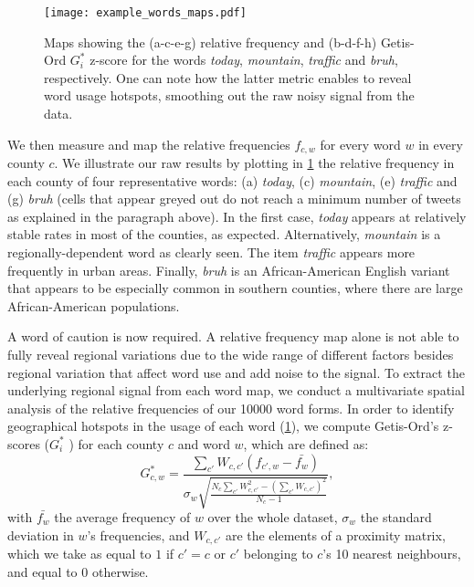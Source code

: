 \documentclass[../thesis.tex]{subfiles}
\begin{document}
\begin{figure}[hpt!]
\centering
  \texttt{[image: example\_words\_maps.pdf]}
  \caption{Maps showing the (a-c-e-g) relative frequency and (b-d-f-h) Getis-Ord
  $G_i^*$ z-score for the words \textit{today}, \textit{mountain}, \textit{traffic} and
  \textit{bruh}, respectively. One can note how the latter metric enables to reveal word
  usage hotspots, smoothing out the raw noisy signal from the data.}
  \label{fig:example_words_maps}
\end{figure}

We then measure and map the relative frequencies $f_{c, w}$ for every word $w$ in every
county $c$. We illustrate our raw results by plotting in \cref{fig:example_words_maps}
the relative frequency in each county of four representative words: (a) \textit{today},
(c) \textit{mountain}, (e) \textit{traffic} and (g) \textit{bruh} (cells that appear
greyed out do not reach a minimum number of tweets as explained in the paragraph above).
In the first case, \textit{today} appears at relatively stable rates in most of the
counties, as expected. Alternatively, \textit{mountain} is a regionally-dependent word
as clearly seen. The item \textit{traffic} appears more frequently in urban areas.
Finally, \textit{bruh} is an African-American English variant that appears to be
especially common in southern counties, where there are large African-American
populations.

A word of caution is now required. A relative frequency map alone is not able to fully
reveal regional variations due to the wide range of different factors besides regional
variation that affect word use and add noise to the signal. To extract the underlying
regional signal from each word map, we conduct a multivariate spatial analysis
\cite{GrieveStatisticalMethod2011,GrieveRegionalVariation2016} of the relative
frequencies of our \SI{10000}{} word forms. In order to identify geographical hotspots
in the usage of each word (\cref{fig:example_words_maps}), we compute Getis-Ord's
z-scores ($G_i^*$ \cite{OrdLocalSpatial1995}) for each county $c$ and word $w$, which
are defined as:
\begin{equation}
\label{eq:Gi_star}
  G_{c, w}^* = \frac{
      \sum_{c'} W_{c, c'} (f_{c', w} - \bar{f_w})
    }{
      \sigma_w \sqrt{\frac{
        N_c \sum_{c'} W_{c, c'}^2
          - \left( \sum_{c'} W_{c, c'} \right)^2
        }{
          N_c - 1
        }
      }
    },
\end{equation}
with $\bar{f_w}$ the average frequency of $w$ over the whole dataset, $\sigma_w$ the
standard deviation in $w$'s frequencies, and $W_{c, c'}$ are the elements of a proximity
matrix, which we take as equal to $1$ if $c' = c$ or $c'$ belonging to $c$'s 10 nearest
neighbours, and equal to $0$ otherwise.
\end{document}
